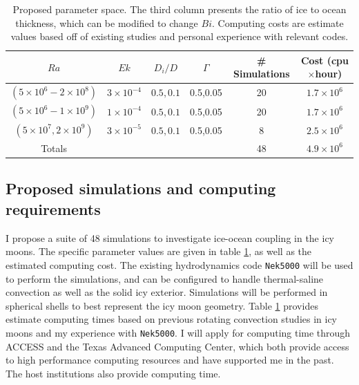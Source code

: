 \documentclass[12pt]{article}
\def\lb{\left(}
\def\rb{\right)}
\begin{document}
\begin{table}
\begin{center}
\begin{tabular}{|c|c|c|c|c|c|}
\hline
$Ra$&$Ek$&$D_{i}/D$& $\Gamma$ &\# Simulations & Cost (cpu$\times$hour)\\
		\hline
$\lb 5 \times 10^{6} - 2 \times 10^{8} \rb $ & $3 \times 10^{-4} $ & $0.5,0.1$&0.5,0.05&20&$1.7 \times 10^{6}$\\
  	\hline
$\lb 5 \times 10^{6} - 1 \times 10^{9} \rb $ & $1 \times 10^{-4} $ & $0.5,0.1$&0.5,0.05&20&$1.7\times 10^{6}$\\
  	\hline
$\lb 5\times 10^{7}, 2 \times 10^{9} \rb $ & $3 \times 10^{-5} $ & $0.5,0.1$&0.5,0.05&8&$2.5\times 10^6$\\
		\hline
		\hline
Totals & & & &48&$4.9 \times 10^6$ \\
		\hline
\end{tabular}
\end{center}
\caption{Proposed parameter space. The third column presents the ratio of ice to ocean thickness, which can be modified to change $Bi$. Computing costs are estimate values based off of existing studies \citep{dL23,rM19} and personal experience with relevant codes.}
\label{t:param}
\end{table}


\subsection{Proposed simulations and computing requirements}
I propose a suite of 48 simulations to investigate ice-ocean coupling in the icy moons. The specific parameter values are given in table \ref{t:param}, as well as the estimated computing cost.  The existing hydrodynamics code \texttt{Nek5000} \citep{nek5000} will be used to perform the simulations, and can be configured to handle thermal-saline convection as well as the solid icy exterior.
Simulations will be performed in spherical shells to best represent the icy moon geometry.
Table \ref{t:param} provides estimate computing times based on previous rotating convection studies in icy moons \citep{dL23} and my experience with \texttt{Nek5000}.
 I will apply for computing time through ACCESS and the Texas Advanced Computing Center, which both provide access to high performance computing resources and have supported me in the past. The host institutions also provide computing time.
\end{document}
